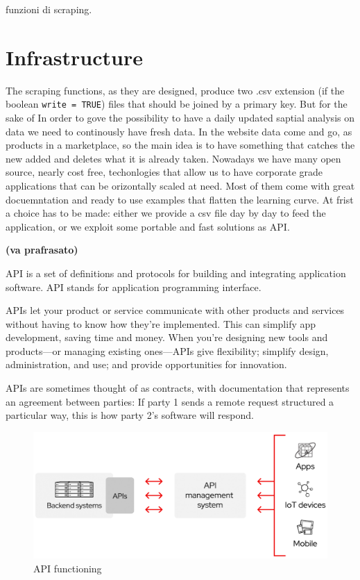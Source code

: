 \documentclass[
  12pt,
  a4paper,
  oneside]{book}
\begin{document}
funzioni di scraping.

\hypertarget{Infrastructure}{%
\chapter{Infrastructure}\label{Infrastructure}}

The scraping functions, as they are designed, produce two .csv extension (if the boolean \texttt{write\ =\ TRUE}) files that should be joined by a primary key. But for the sake of
In order to gove the possibility to have a daily updated saptial analysis on data we need to continously have fresh data. In the website data come and go, as products in a marketplace, so the main idea is to have something that catches the new added and deletes what it is already taken.
Nowadays we have many open source, nearly cost free, techonlogies that allow us to have corporate grade applications that can be orizontally scaled at need. Most of them come with great docuemntation and ready to use examples that flatten the learning curve.
At frist a choice has to be made: either we provide a csv file day by day to feed the application, or we exploit some portable and fast solutions as API.

\textbf{(va prafrasato)}

API is a set of definitions and protocols for building and integrating application software. API stands for application programming interface.

APIs let your product or service communicate with other products and services without having to know how they're implemented. This can simplify app development, saving time and money. When you're designing new tools and products---or managing existing ones---APIs give flexibility; simplify design, administration, and use; and provide opportunities for innovation.

APIs are sometimes thought of as contracts, with documentation that represents an agreement between parties: If party 1 sends a remote request structured a particular way, this is how party 2's software will respond.

\begin{figure}
\includegraphics[width=16.25in]{images/API-page-graphic} \caption{API functioning}\label{fig:API}
\end{figure}
\end{document}
